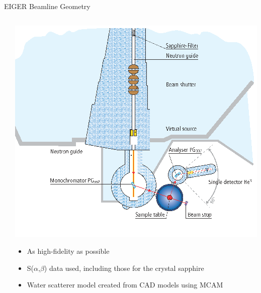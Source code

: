 \documentclass[final,t]{beamer}
\begin{document}
\begin{frame}{}
\begin{columns}[t]
\begin{column}{.3\linewidth}
\begin{block}{EIGER Beamline Geometry}
\begin{columns}[T]
\begin{column}{.75\linewidth}
        \end{column}
          \begin{column}{.25\linewidth}

          \begin{center}
          \includegraphics*[width=\linewidth]{eiger_lr.png}
          \end{center}

          \begin{itemize} 
          \item As high-fidelity as possible
          \item S($\alpha$,$\beta$) data used, including those for the crystal sapphire \cite{sapp}
          \item Water scatterer model created from CAD models using MCAM \cite{mcam}
          \end{itemize}

        \end{column}
      \end{columns}
      
      \end{block}



      \end{column}




\end{columns}
\end{frame}
\end{document}
